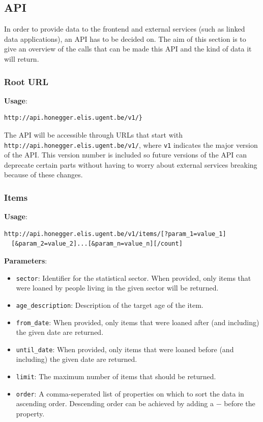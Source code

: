 \subsection{API}

In order to provide data to the frontend and external services (such as linked data applications), an API has to be decided on. The aim of this section is to give an overview of the calls that can be made this API and the kind of data it will return.

\subsubsection{Root URL}

{\bf Usage}:
\begin{verbatim}
http://api.honegger.elis.ugent.be/v1/}
\end{verbatim}

The API will be accessible through URLs that start with \texttt{http://api.honegger.elis.ugent.be/v1/}, where \texttt{v1} indicates the major version of the API. This version number is included so future versions of the API can deprecate certain parts without having to worry about external services breaking because of these changes.

\subsubsection{Items}

{\bf Usage}:
\begin{verbatim}
http://api.honegger.elis.ugent.be/v1/items/[?param_1=value_1]
  [&param_2=value_2]...[&param_n=value_n][/count]
\end{verbatim}

{\bf Parameters}:
\begin{itemize}
  \item \texttt{sector}: Identifier for the statistical sector. When provided, only items that were loaned by people living in the given sector will be returned.
  \item \texttt{age\_description}: Description of the target age of the item.
  \item \texttt{from\_date}: When provided, only items that were loaned after (and including) the given date are returned.
  \item \texttt{until\_date}: When provided, only items that were loaned before (and including) the given date are returned.
  \item \texttt{limit}: The maximum number of items that should be returned.
  \item \texttt{order}: A comma-seperated list of properties on which to sort the data in ascending order. Descending order can be achieved by adding a $-$ before the property.
\end{itemize}


